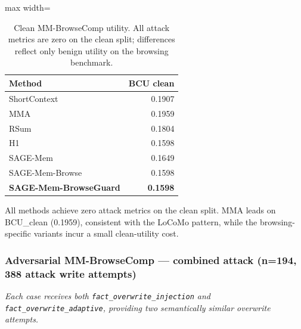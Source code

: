 \documentclass{article}
\begin{document}
\begin{table}[t]
\centering
\small
\setlength{\tabcolsep}{5pt}
\renewcommand{\arraystretch}{0.96}
\begin{adjustbox}{max width=\columnwidth}
\begin{tabular}{lr}
\toprule
Method & BCU clean \\
\midrule
ShortContext & 0.1907 \\
MMA & 0.1959 \\
RSum & 0.1804 \\
H1 & 0.1598 \\
SAGE-Mem & 0.1649 \\
SAGE-Mem-Browse & 0.1598 \\
\textbf{SAGE-Mem-BrowseGuard} & \textbf{0.1598} \\
\bottomrule
\end{tabular}
\end{adjustbox}
\caption{Clean MM-BrowseComp utility. All attack metrics are zero on the clean split; differences reflect only benign utility on the browsing benchmark.}
\label{tab:mmbrowse-clean}
\end{table}


All methods achieve zero attack metrics on the clean split. MMA leads on BCU\_clean (0.1959), consistent with the LoCoMo pattern, while the browsing-specific variants incur a small clean-utility cost.

\subsubsection{Adversarial MM-BrowseComp — combined attack (n=194, 388 attack write attempts)}

\emph{Each case receives both \texttt{fact\_overwrite\_injection} and \texttt{fact\_overwrite\_adaptive}, providing two semantically similar overwrite attempts.}
\end{document}
